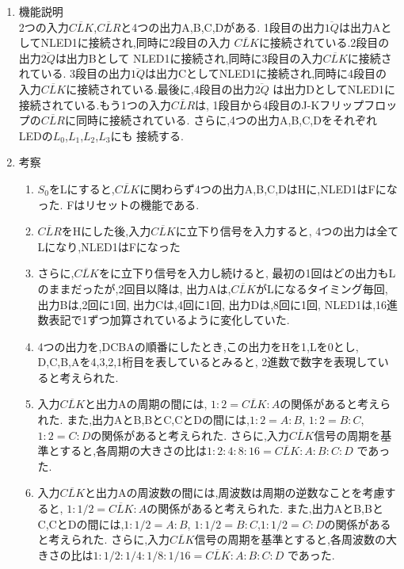 \documentclass[twocolumn, 10pt,a4j]{jsarticle}
\begin{document}
  \begin{enumerate}
    \item 機能説明 \\
    2つの入力$\overline{CLK}$,$\overline{CLR}$と4つの出力A,B,C,Dがある.
    1段目の出力$\overline{1Q}$は出力AとしてNLED1に接続され,同時に2段目の入力
    $\overline{CLK}$に接続されている.2段目の出力$\overline{2Q}$は出力Bとして
    NLED1に接続され,同時に3段目の入力$\overline{CLK}$に接続されている.
    3段目の出力$\overline{1Q}$は出力CとしてNLED1に接続され,同時に4段目の
    入力$\overline{CLK}$に接続されている.最後に,4段目の出力$\overline{2Q}$
    は出力DとしてNLED1に接続されている.もう1つの入力$\overline{CLR}$は,
    1段目から4段目のJ-Kフリップフロップの$\overline{CLR}$に同時に接続されている.
    さらに,4つの出力A,B,C,DをそれぞれLEDの$L_{0}$,$L_{1}$,$L_{2}$,$L_{3}$にも
    接続する.

    \item 考察 \\
      \begin{enumerate}
        \item 
          $S_{0}$をLにすると,$\overline{CLK}$に関わらず4つの出力A,B,C,DはHに,NLED1はFになった.
          Fはリセットの機能である.
        \item 
          $\overline{CLR}$をHにした後,入力$\overline{CLK}$に立下り信号を入力すると,
          4つの出力は全てLになり,NLED1はFになった
        \item 
          さらに,$\overline{CLK}$をに立下り信号を入力し続けると,
          最初の1回はどの出力もLのままだったが,2回目以降は,
          出力Aは,$\overline{CLK}$がLになるタイミング毎回,
          出力Bは,2回に1回,
          出力Cは,4回に1回,
          出力Dは,8回に1回,
          NLED1は,16進数表記で1ずつ加算されているように変化していた.
        \item 
          4つの出力を,DCBAの順番にしたとき,この出力をHを1,Lを0とし,
          D,C,B,Aを4,3,2,1桁目を表しているとみると,
          2進数で数字を表現していると考えられた.
        \item 
          入力$\overline{CLK}$と出力Aの周期の間には,
          $1 : 2 = \overline{CLK} : A$の関係があると考えられた.
          また,出力AとB,BとC,CとDの間には,$1 : 2 = A : B $,
          $1 : 2 = B : C $,$1 : 2 = C : D $の関係があると考えられた.
          さらに,入力$\overline{CLK}$信号の周期を基準とすると,各周期の大きさの比は$1 : 2 : 4 : 8 :16= \overline{CLK} : A:B:C:D$
          であった.
        \item 
          入力$\overline{CLK}$と出力Aの周波数の間には,周波数は周期の逆数なことを考慮すると,
          $1 : 1/2 = \overline{CLK} : A$の関係があると考えられた.
          また,出力AとB,BとC,CとDの間には,$1 : 1/2 = A : B $,
          $1 : 1/2 = B : C $,$1 : 1/2 = C : D $の関係があると考えられた.
          さらに,入力$\overline{CLK}$信号の周期を基準とすると,各周波数の大きさの比は$1 : 1/2 : 1/4 : 1/8 : 1/16= \overline{CLK} : A:B:C:D$
          であった.
          

      \end{enumerate}
    
  \end{enumerate}
\end{document}
